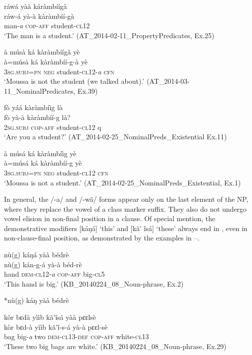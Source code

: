 \documentclass[output=paper]{langsci/langscibook}
\begin{document}
\ea\label{ex:teo:17}
ráwá yàà káràmbíígà\\
\gll ráw-á yà-à kàràmbíí-gà\\
man-\textit{a} \textsc{cop-aff} student-\textsc{cl12}\\
\glt ‘The man is a student.’ (AT\_2014-02-11\_PropertyPredicates, Ex.25)
\z


\ea\label{ex:teo:18}
à músà ká kàràmbíígà yè\\
\gll à=músà ká kàràmbíí-g-à yè \\
3\textsc{sg.subj=pn neg} student-\textsc{cl}12-\textit{a} \textsc{cfn}\\
\glt ‘Moussa is not the student (we talked about).’ (AT\_2014-03-11\_NominalPredicates, Ex.39)
\z

\ea\label{ex:teo:19}
fò yáá kàràmbíìg là\\
\gll fò yà-à kàràmbíí-g là?\\
2\textsc{sg.subj cop-aff} student-\textsc{cl}12 q\\
\glt ‘Are you a student?’ (AT\_2014-02-25\_NominalPreds\_Existential Ex.11)
\z

\ea\label{ex:teo:20}
à músá ká kàràmbíìg yè\\
\gll à=músá ká kàràmbíí-g yè\\
3\textsc{sg.subj=pn neg} student-\textsc{cl}12 \textsc{cfn}\\
\glt ‘Moussa is not a student.’ (AT\_2014-02-25\_NominalPreds\_Existential, Ex.1)
\z

In general, the /-a/ and /-wã/ forms appear only on the last element of the NP, where they replace the vowel of a class marker suffix. They also do not undergo vowel elision in non-final position in a clause. Of special mention, the demonstrative modifiers [káŋá] ‘this’ and [kã\'{} \~{i}sá] ‘these’ always end in \-[-a], even in non-clause-final position, as demonstrated by the examples in –.

\ea\label{ex:teo:21}
nù(g) káŋá yàà bédrè\\
\gll nù(g) kán-g-á yà-à béd-rè\\
hand \textsc{dem-cl}12-\textit{a} \textsc{cop-aff} big-\textsc{cl}5 \\
\glt ‘This hand is big.’ (KB\_20140224\_08\_Noun-phrase, Ex.2)
\z

\ea\label{ex:teo:22}
*nù(g) káŋ yàà bédrè
\z

\ea\label{ex:teo:23}
kòr bɛdà yììb kã\'{}\~{i}sá yàà pɛɛlsè\\
\gll kòr bɛd-à yììb kã\'{}\~{i}-s-á yà-à pɛɛl-sè\\
bag big-\textit{a} two \textsc{dem}-\textsc{cl13-}\textsc{def} \textsc{cop-aff} white-\textsc{cl13}\\
\glt ‘These two big bags are white.’ (KB\_20140224\_08\_Noun-phrase, Ex.29)
\z
{}
\end{document}
